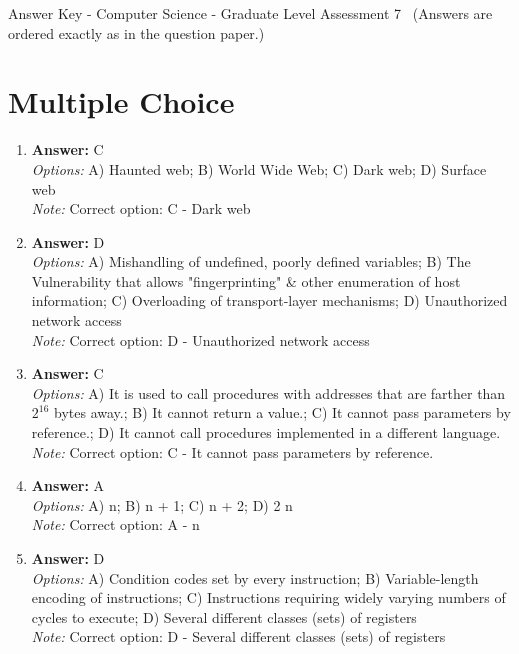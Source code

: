 \documentclass[12pt]{article}
\begin{document}
\begin{center}
Answer Key - Computer Science - Graduate Level Assessment 7 \
\small (Answers are ordered exactly as in the question paper.)
\end{center}

\section*{Multiple Choice}
\begin{enumerate}[label=\arabic*.]
\item \textbf{Answer:} C
\\ \textit{Options:} A) Haunted web; B) World Wide Web; C) Dark web; D) Surface web
\\ \textit{Note:} Correct option: C - Dark web
\item \textbf{Answer:} D
\\ \textit{Options:} A) Mishandling of undefined, poorly defined variables; B) The Vulnerability that allows "fingerprinting" \& other enumeration of host information; C) Overloading of transport-layer mechanisms; D) Unauthorized network access
\\ \textit{Note:} Correct option: D - Unauthorized network access
\item \textbf{Answer:} C
\\ \textit{Options:} A) It is used to call procedures with addresses that are farther than $2^16$ bytes away.; B) It cannot return a value.; C) It cannot pass parameters by reference.; D) It cannot call procedures implemented in a different language.
\\ \textit{Note:} Correct option: C - It cannot pass parameters by reference.
\item \textbf{Answer:} A
\\ \textit{Options:} A) n; B) n + 1; C) n + 2; D) 2 n
\\ \textit{Note:} Correct option: A - n
\item \textbf{Answer:} D
\\ \textit{Options:} A) Condition codes set by every instruction; B) Variable-length encoding of instructions; C) Instructions requiring widely varying numbers of cycles to execute; D) Several different classes (sets) of registers
\\ \textit{Note:} Correct option: D - Several different classes (sets) of registers
\end{enumerate}
\end{document}
